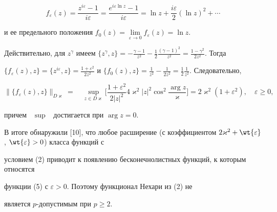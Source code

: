 \begin{equation}


f_{\varepsilon} (z)=\frac{{z^{i\varepsilon}-


1}}{{i\varepsilon}}=\frac{{e^{i\varepsilon \ln z}-1}}{{i\varepsilon}}=


\ln z+\frac{i\varepsilon}{2}({\ln z})^2+\dotsb


\end{equation}


и ее предельного положения $f_0 (z)=


\lim\limits_{\varepsilon \to 0} f_{\varepsilon} (z)=\ln z$. 


Действительно, для $z^{\gamma}$ имеем $\{z^{\gamma},z\} =-\frac{{\gamma 


-1}}{{z^2}}-\frac{1}{2}\frac{{({\gamma-1} 


)^2}}{{z^2}}=\frac{{1-\gamma^2}}{{2z^2}}$. Тогда 


$\{f_{\varepsilon} (z),z\}=\{z^{i\varepsilon},z\}=


\frac{{1+\varepsilon^2}}{{2z^2}}$ и $\{f_0 (z),z\} 


= \frac{1}{{z^2}}-\frac{1}{{2z^2}}=


\frac{1}{2}\frac{1}{{z^2}}$. Следовательно, 


$$


\|\{f_{\varepsilon} (z),z\} \|_{D\varkappa} =\quad


\sup_{z \in D\varkappa} \bigg[{\frac{{1+\varepsilon 


^2}}{{2|z|^2}}4\varkappa^2|z|^2\cos^2\frac{{\arg z}}{{\varkappa}}} 


\bigg]=2\varkappa^2({1+\varepsilon^2}),\quad


\varepsilon \ge 0,


$$


причем \ $\sup$ \ достигается при $\arg z=0$. 





В итоге обнаружили [10], что любое расширение (с коэффициентом $2\varkappa^2 


+ \wt {\varepsilon}$, $\wt {\varepsilon} > 0$) класса функций с 


условием (2) приводит к появлению бесконечнолистных функций, к которым относятся 


функции (5) с $\varepsilon>0$. Поэтому функционал Нехари из (2) не 


является $p$-допустимым при $p \ge 2$.


\medskip





